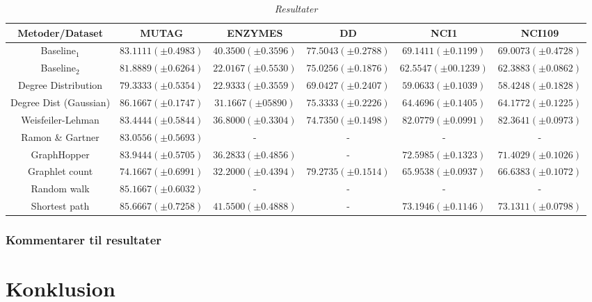 \documentclass{article}
\begin{document}
\begin{table}[H]
\begin{center}
\scalebox{0.7} {
\begin{tabular}{c|c|c|c|c|c}
Metoder/Dataset & MUTAG & ENZYMES & DD & NCI1 & NCI109 \\
\hline
Baseline$_1$ & $83.1111(\pm 0.4983)$ & $40.3500(\pm 0.3596)$ & $77.5043(\pm 0.2788)$ & $69.1411(\pm 0.1199)$ & $69.0073(\pm 0.4728)$ \\
Baseline$_2$ & $81.8889 (\pm 0.6264)$ & $22.0167 (\pm 0.5530)$ & $75.0256 (\pm 0.1876)$ & $62.5547 (\pm 00.1239)$ & $62.3883 (\pm 0.0862)$ \\
Degree Distribution & $79.3333 (\pm 0.5354)$ & $22.9333 (\pm 0.3559)$ & $69.0427 (\pm 0.2407)$ & $59.0633 (\pm 0.1039)$ & $58.4248 (\pm 0.1828)$ \\
Degree Dist (Gaussian) & $86.1667 (\pm 0.1747)$ & $31.1667 (\pm 05890)$  & $75.3333 (\pm 0.2226)$ & $64.4696 (\pm 0.1405)$ & $64.1772 (\pm 0.1225)$ \\
Weisfeiler-Lehman & $83.4444 (\pm 0.5844)$ & $36.8000 (\pm 0.3304)$ & $74.7350 (\pm 0.1498)$ & $82.0779 (\pm 0.0991)$ &  $82.3641 (\pm 0.0973)$ \\
Ramon \& Gartner & $83.0556 (\pm 0.5693)$ & - & - & - & - \\
GraphHopper & $83.9444 (\pm 0.5705)$ & $36.2833 (\pm 0.4856)$ & - & $72.5985 (\pm 0.1323)$ & $71.4029 (\pm 0.1026)$ \\
Graphlet count & $74.1667 (\pm 0.6991)$ & $32.2000 (\pm 0.4394)$ & $79.2735 (\pm 0.1514)$ & $65.9538 (\pm 0.0937)$ & $66.6383 (\pm 0.1072)$ \\
Random walk & $85.1667 (\pm 0.6032)$ & - & - & - & - \\
Shortest path & $85.6667 (\pm 0.7258)$ & $41.5500 (\pm 0.4888)$ & - & $73.1946 (\pm 0.1146)$ & $73.1311 (\pm 0.0798)$ \\
\end{tabular}
}
\caption{\textit{Resultater}}

\end{center}
\end{table}


\subsubsection{Kommentarer til resultater}

\section{Konklusion}
\end{document}
